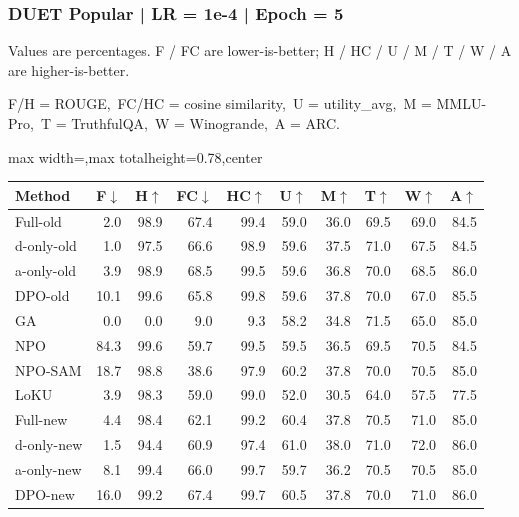 \documentclass[aspectratio=169,11pt]{beamer}
\begin{document}
\begin{frame}[t]
\frametitle{DUET Popular | LR = 1e-4 | Epoch = 5}
{\tiny Values are percentages. F / FC are lower-is-better; H / HC / U / M / T / W / A are higher-is-better.}

{\tiny F/H = ROUGE,\ FC/HC = cosine similarity,\ U = utility\_avg,\ M = MMLU-Pro,\ T = TruthfulQA,\ W = Winogrande,\ A = ARC.}

\vspace{0.35em}
\centering
\scriptsize
\setlength{\tabcolsep}{3.6pt}
\renewcommand{\arraystretch}{1.05}
\begin{adjustbox}{max width=\textwidth,max totalheight=0.78\textheight,center}
\begin{tabular}{l*{9}{r}}
\toprule
Method & F$\downarrow$ & H$\uparrow$ & FC$\downarrow$ & HC$\uparrow$ & U$\uparrow$ & M$\uparrow$ & T$\uparrow$ & W$\uparrow$ & A$\uparrow$ \\
\midrule
\rowcolor{blue!10}
Full-old & 2.0 & 98.9 & 67.4 & 99.4 & 59.0 & 36.0 & 69.5 & 69.0 & 84.5 \\
\rowcolor{orange!10}
d-only-old & 1.0 & 97.5 & 66.6 & 98.9 & 59.6 & 37.5 & 71.0 & 67.5 & 84.5 \\
\rowcolor{green!10}
a-only-old & 3.9 & 98.9 & 68.5 & 99.5 & 59.6 & 36.8 & 70.0 & 68.5 & 86.0 \\
\rowcolor{gray!8}
DPO-old & 10.1 & 99.6 & 65.8 & 99.8 & 59.6 & 37.8 & 70.0 & 67.0 & 85.5 \\
\rowcolor{gray!8}
GA & 0.0 & 0.0 & 9.0 & 9.3 & 58.2 & 34.8 & 71.5 & 65.0 & 85.0 \\
\rowcolor{gray!8}
NPO & 84.3 & 99.6 & 59.7 & 99.5 & 59.5 & 36.5 & 69.5 & 70.5 & 84.5 \\
\rowcolor{gray!8}
NPO-SAM & 18.7 & 98.8 & 38.6 & 97.9 & 60.2 & 37.8 & 70.0 & 70.5 & 85.0 \\
\rowcolor{gray!8}
LoKU & 3.9 & 98.3 & 59.0 & 99.0 & 52.0 & 30.5 & 64.0 & 57.5 & 77.5 \\
\rowcolor{blue!20}
Full-new & 4.4 & 98.4 & 62.1 & 99.2 & 60.4 & 37.8 & 70.5 & 71.0 & 85.0 \\
\rowcolor{orange!20}
d-only-new & 1.5 & 94.4 & 60.9 & 97.4 & 61.0 & 38.0 & 71.0 & 72.0 & 86.0 \\
\rowcolor{green!20}
a-only-new & 8.1 & 99.4 & 66.0 & 99.7 & 59.7 & 36.2 & 70.5 & 70.5 & 85.0 \\
\rowcolor{gray!15}
DPO-new & 16.0 & 99.2 & 67.4 & 99.7 & 60.5 & 37.8 & 70.0 & 71.0 & 86.0 \\
\bottomrule
\end{tabular}
\end{adjustbox}
\end{frame}
\end{document}
